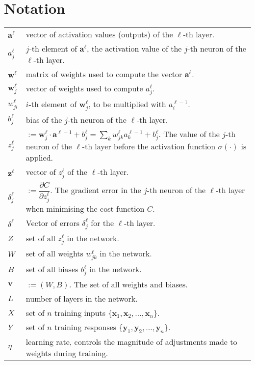 \section*{Notation}

\begin{tabular}{p{1cm}p{13cm}}
$\mathbf{a}^\ell$ & vector of activation values (outputs) of the $\ell$-th layer.\\
$a_j^\ell$ & $j$-th element of $\mathbf{a}^\ell$, the activation value of the $j$-th neuron of the $\ell$-th layer.\\
$\mathbf{w}^\ell$ & matrix of weights used to compute the vector $\mathbf{a}^\ell$.\\
$\mathbf{w}^\ell_j$ & vector of weights used to compute $a_j^\ell$.\\
$w_{ji}^\ell$ & $i$-th element of $\mathbf{w}^\ell_j$, to be multiplied with $a_i^{\ell-1}$.\\
$b_j^\ell$ & bias of the $j$-th neuron of the $\ell$-th layer.\\
$z_j^\ell$ & $:= \mathbf{w}_j^\ell\cdot \mathbf{a}^{\ell-1} + b_j^\ell= \sum_k w_{jk}^\ell a_k^{\ell-1} + b_j^\ell$. The value of the $j$-th neuron of the $\ell$-th layer before the activation function $\sigma(\cdot)$ is applied.\\
$\mathbf{z}^\ell$ & vector of $z_j^\ell$ of the $\ell$-th layer.\\
$\delta_j^\ell$ & $:=\dfrac{\partial C}{\partial z_j^\ell}$. The gradient error in the $j$-th neuron of the $\ell$-th layer when minimising the cost function $C$.\\
$\delta^\ell$ & Vector of errors $\delta_j^\ell$ for the $\ell$-th layer.\\
$Z$ & set of all $z_j^\ell$ in the network. \\
$W$ & set of all weights $w_{jk}^\ell$ in the network.\\
$B$ & set of all biases $b_j^\ell$ in the network. \\
$\mathbf{v}$ & $:= (W,B)$. The set of all weights and biases.\\
$L$ & number of layers in the network.\\
$X$ & set of $n$ training inputs $\{\mathbf{x}_1, \mathbf{x}_2, \ldots, \mathbf{x}_n\}$. \\
$Y$ & set of $n$ training responses $\{\mathbf{y}_1, \mathbf{y}_2, \ldots, \mathbf{y}_n\}$.\\
$\eta$ & learning rate, controls the magnitude of adjustments made to weights during training.
\end{tabular}